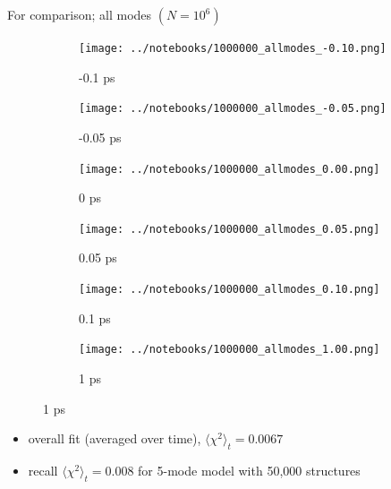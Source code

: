 \documentclass{beamer}
\newcommand\w{0.32}
\begin{document}
\begin{frame}{For comparison; all modes $(N= 10^6)$}
	\begin{figure}
		\centering
		\begin{subfigure}[b]{\w\textwidth}
			\centering
			\texttt{[image: ../notebooks/1000000\_allmodes\_-0.10.png]}
			\caption{-0.1 ps}
		\end{subfigure}
		\begin{subfigure}[b]{\w\textwidth}
			\centering
			\texttt{[image: ../notebooks/1000000\_allmodes\_-0.05.png]}
			\caption{-0.05 ps}
		\end{subfigure}
		\begin{subfigure}[b]{\w\textwidth}
			\centering
			\texttt{[image: ../notebooks/1000000\_allmodes\_0.00.png]}
			\caption{0 ps}
		\end{subfigure}
		\begin{subfigure}[b]{\w\textwidth}
			\centering
			\texttt{[image: ../notebooks/1000000\_allmodes\_0.05.png]}
			\caption{0.05 ps}
		\end{subfigure}
		\begin{subfigure}[b]{\w\textwidth}
			\centering
			\texttt{[image: ../notebooks/1000000\_allmodes\_0.10.png]}
			\caption{0.1 ps}
		\end{subfigure}
		\begin{subfigure}[b]{\w\textwidth}
			\centering
			\texttt{[image: ../notebooks/1000000\_allmodes\_1.00.png]}
			\caption{1 ps}
		\end{subfigure}
	\end{figure}
	\begin{itemize}
		\item overall fit (averaged over time), $\langle\chi^2\rangle_t = 0.0067$
		\item recall $\langle\chi^2\rangle_t = 0.008$ for 5-mode model with 50,000 structures
	\end{itemize}
\end{frame}
\end{document}
